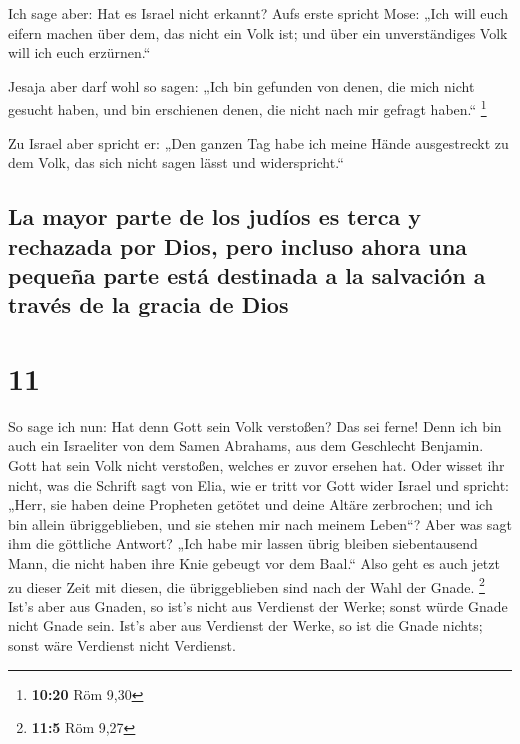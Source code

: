  Ich sage aber: Hat es Israel nicht erkannt? Aufs erste
spricht Mose: „Ich will euch eifern machen über dem, das nicht ein Volk
ist; und über ein unverständiges Volk will ich euch erzürnen.``

 Jesaja aber darf wohl so sagen: „Ich bin gefunden von
denen, die mich nicht gesucht haben, und bin erschienen denen, die nicht
nach mir gefragt haben.`` \footnote{\textbf{10:20} Röm 9,30}

 Zu Israel aber spricht er: „Den ganzen Tag habe ich
meine Hände ausgestreckt zu dem Volk, das sich nicht sagen lässt und
widerspricht.``

\hypertarget{la-mayor-parte-de-los-juduxedos-es-terca-y-rechazada-por-dios-pero-incluso-ahora-una-pequeuxf1a-parte-estuxe1-destinada-a-la-salvaciuxf3n-a-travuxe9s-de-la-gracia-de-dios}{%
\subsection{La mayor parte de los judíos es terca y rechazada por Dios,
pero incluso ahora una pequeña parte está destinada a la salvación a
través de la gracia de
Dios}\label{la-mayor-parte-de-los-juduxedos-es-terca-y-rechazada-por-dios-pero-incluso-ahora-una-pequeuxf1a-parte-estuxe1-destinada-a-la-salvaciuxf3n-a-travuxe9s-de-la-gracia-de-dios}}

\hypertarget{section-10}{%
\section{11}\label{section-10}}

 So sage ich nun: Hat denn Gott sein Volk verstoßen? Das
sei ferne! Denn ich bin auch ein Israeliter von dem Samen Abrahams, aus
dem Geschlecht Benjamin.  Gott hat sein Volk nicht
verstoßen, welches er zuvor ersehen hat. Oder wisset ihr nicht, was die
Schrift sagt von Elia, wie er tritt vor Gott wider Israel und spricht:
 „Herr, sie haben deine Propheten getötet und deine Altäre
zerbrochen; und ich bin allein übriggeblieben, und sie stehen mir nach
meinem Leben``?  Aber was sagt ihm die göttliche Antwort?
„Ich habe mir lassen übrig bleiben siebentausend Mann, die nicht haben
ihre Knie gebeugt vor dem Baal.``  Also geht es auch jetzt
zu dieser Zeit mit diesen, die übriggeblieben sind nach der Wahl der
Gnade. \footnote{\textbf{11:5} Röm 9,27}  Ist's aber aus
Gnaden, so ist's nicht aus Verdienst der Werke; sonst würde Gnade nicht
Gnade sein. Ist's aber aus Verdienst der Werke, so ist die Gnade nichts;
sonst wäre Verdienst nicht Verdienst.

